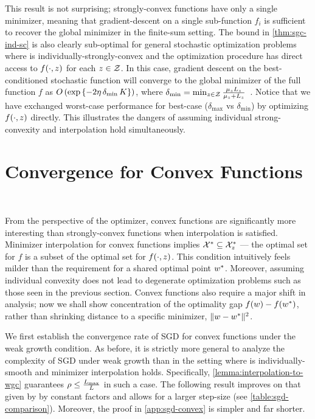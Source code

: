 This result is not surprising; strongly-convex functions have only a single minimizer, meaning that gradient-descent on a single sub-function \( f_i \) is sufficient to recover the global minimizer in the finite-sum setting. 
The bound in \autoref{thm:sgc-ind-sc} is also clearly sub-optimal for general stochastic optimization problems where \oracle{} is individually-strongly-convex and the optimization procedure has direct access to \( f(\cdot, z ) \) for each \( z \in \mathcal{Z} \).
In this case, gradient descent on the best-conditioned stochastic function will converge to the global minimizer of the full function \( f \) as \( O\left(\exp\left\{ - 2 \eta \, \delta_{\text{min}} \, K\right\}\right) \), where \( \delta_{\text{min}} = \min_{z \in \mathcal{Z}} \frac{\mu_z L_z}{\mu_z + L_z} \)~\citep{bubeck2015convex}.
Notice that we have exchanged worst-case performance for best-case (\( \delta_{\text{max}} \) vs \( \delta_{\text{min}} \)) by optimizing \( f(\cdot, z) \) directly. 
This illustrates the dangers of assuming individual strong-convexity and interpolation hold simultaneously.


\section{Convergence for Convex Functions}~\label{sec:sgd-convex}

From the perspective of the optimizer, convex functions are significantly more interesting than strongly-convex functions when interpolation is satisfied. 
Minimizer interpolation for convex functions implies \( \mathcal{X}^* \subseteq \mathcal{X}^*_{z} \) --- the optimal set for \( f \) is a subset of the optimal set for \( f(\cdot, z) \).
This condition intuitively feels milder than the requirement for a shared optimal point \( w^* \). 
Moreover, assuming individual convexity does not lead to degenerate optimization problems such as those seen in the previous section.
Convex functions also require a major shift in analysis; now we shall show concentration of the optimality gap \( f(w) - f(w^*) \), rather than shrinking distance to a specific minimizer, \( \|w - w^*\|^2 \).

We first establish the convergence rate of \ac{SGD} for convex functions under the weak growth condition. 
As before, it is strictly more general to analyze the complexity of \ac{SGD} under weak growth than in the setting where \oracle{} is individually-smooth and minimizer interpolation holds. 
Specifically, \autoref{lemma:interpolation-to-wgc} guarantees \( \rho \leq \frac{L_{\text{max}}}{L} \) in such a case. 
The following result improves on that given by \citet{vaswani2019fast} by constant factors and allows for a larger step-size (see \autoref{table:sgd-comparison}).  
Moreover, the proof in \autoref{app:sgd-convex} is simpler and far shorter. 

